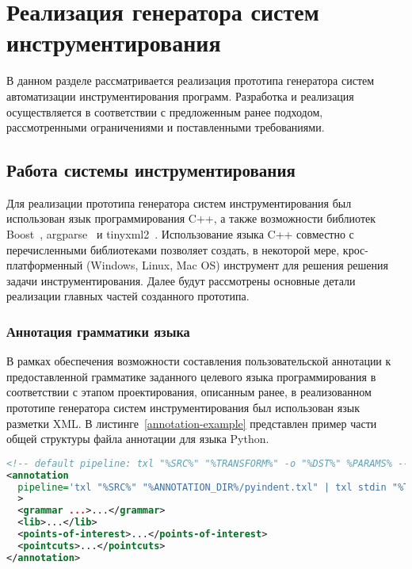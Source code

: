 \chapter{Реализация генератора систем инструментирования}

В данном разделе рассматривается реализация прототипа генератора систем автоматизации инструментирования программ.
Разработка и реализация осуществляется в соответствии с предложенным ранее подходом, рассмотренными ограничениями и поставленными требованиями.

\section{Работа системы инструментирования}

Для реализации прототипа генератора систем инструментирования был использован язык программирования C++, а также возможности библиотек Boost~\cite{boost}, argparse~\cite{argparse} и tinyxml2~\cite{tinyxml2}.
Использование языка C++ совместно с перечисленными библиотеками позволяет создать, в некоторой мере, крос-платформенный (Windows, Linux, Mac OS) инструмент для решения решения задачи инструментирования.
Далее будут рассмотрены основные детали реализации главных частей созданного прототипа.

\subsection{Аннотация грамматики языка}

В рамках обеспечения возможности составления пользовательской аннотации к предоставленной грамматике заданного целевого языка программирования в соответствии с этапом проектирования, описанным ранее, в реализованном прототипе генератора систем инструментирования был использован язык разметки XML.
В листинге~\ref{annotation-example} представлен пример части общей структуры файла аннотации для языка Python.

\begin{lstlisting}[frame=single, language=XML, label={annotation-example}, caption={Пример общей структуры файла аннотации.}]
<!-- default pipeline: txl "%SRC%" "%TRANSFORM%" -o "%DST%" %PARAMS% -->
<annotation
  pipeline='txl "%SRC%" "%ANNOTATION_DIR%/pyindent.txl" | txl stdin "%TRANSFORM%" -o "%DST%" %PARAMS%'
  >
  <grammar ...>...</grammar>
  <lib>...</lib>
  <points-of-interest>...</points-of-interest>
  <pointcuts>...</pointcuts>
</annotation>
\end{lstlisting}


